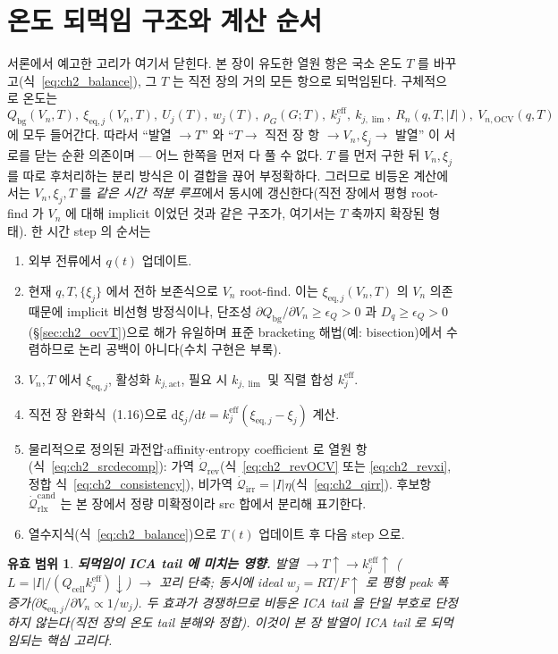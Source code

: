 \documentclass[11pt,a4paper]{article}
\newtheorem*{boundbox}{유효 범위}
\newcommand{\dd}{\mathrm{d}}
\newcommand{\eff}{\mathrm{eff}}
\newcommand{\eq}{\mathrm{eq}}
\newcommand{\cell}{\mathrm{cell}}
\newcommand{\bg}{\mathrm{bg}}
\newcommand{\OCV}{\mathrm{OCV}}
\newcommand{\rev}{\mathrm{rev}}
\newcommand{\irr}{\mathrm{irr}}
\newcommand{\rlx}{\mathrm{rlx}}
\newcommand{\cand}{\mathrm{cand}}
\begin{document}
\section{온도 되먹임 구조와 계산 순서}\label{sec:ch2_feedback}
서론에서 예고한 고리가 여기서 닫힌다. 본 장이 유도한 열원 항은 국소 온도 $T$ 를 바꾸고(식~\eqref{eq:ch2_balance}),
그 $T$ 는 직전 장의 거의 모든 항으로 되먹임된다. 구체적으로 온도는
\begin{equation}
Q_\bg(V_n,T),\ \xi_{\eq,j}(V_n,T),\ U_j(T),\ w_j(T),\ \rho_G(G;T),\ k_j^{\eff},\ k_{j,\lim},\ R_n(q,T,|I|),\ V_{n,\OCV}(q,T)
\label{eq:ch2_feedT}
\end{equation}
에 모두 들어간다. 따라서 ``발열 $\to T$'' 와 ``$T\to$ 직전 장 항 $\to V_n,\xi_j\to$ 발열'' 이 서로를 닫는 순환
의존이며 — 어느 한쪽을 먼저 다 풀 수 없다. $T$ 를 먼저 구한 뒤 $V_n,\xi_j$ 를 따로 후처리하는 분리 방식은 이 결합을
끊어 부정확하다. 그러므로 비등온 계산에서는 $V_n,\xi_j,T$ 를 \emph{같은 시간 적분 루프}에서 동시에 갱신한다(직전
장에서 평형 root-find 가 $V_n$ 에 대해 implicit 이었던 것과 같은 구조가, 여기서는 $T$ 축까지 확장된 형태). 한 시간
step 의 순서는
\begin{enumerate}[label=\arabic*),leftmargin=2.0em,itemsep=1pt]
\item 외부 전류에서 $q(t)$ 업데이트.
\item 현재 $q,T,\{\xi_j\}$ 에서 전하 보존식으로 $V_n$ root-find. 이는 $\xi_{\eq,j}(V_n,T)$ 의 $V_n$ 의존 때문에
  implicit 비선형 방정식이나, 단조성 $\partial Q_\bg/\partial V_n\ge\epsilon_Q>0$ 과 $D_q\ge\epsilon_Q>0$
  (\S\ref{sec:ch2_ocvT})으로 해가 유일하며 표준 bracketing 해법(예: bisection)에서 수렴하므로 논리 공백이
  아니다(수치 구현은 부록).
\item $V_n,T$ 에서 $\xi_{\eq,j}$, 활성화 $k_{j,\mathrm{act}}$, 필요 시 $k_{j,\lim}$ 및 직렬 합성 $k_j^{\eff}$.
\item 직전 장 완화식~(1.16)으로 $\dd\xi_j/\dd t=k_j^{\eff}(\xi_{\eq,j}-\xi_j)$ 계산.
\item 물리적으로 정의된 과전압$\cdot$affinity$\cdot$entropy coefficient 로 열원 항(식~\eqref{eq:ch2_srcdecomp}):
  가역 $\dot{\mathcal Q}_{\rev}$(식~\eqref{eq:ch2_revOCV} 또는 \eqref{eq:ch2_revxi}, 정합 식~\eqref{eq:ch2_consistency}),
  비가역 $\dot{\mathcal Q}_{\irr}=|I|\eta$(식~\eqref{eq:ch2_qirr}). 후보항 $\dot{\mathcal Q}_{\rlx}^{\cand}$ 는
  본 장에서 정량 미확정이라 src 합에서 분리해 표기한다.
\item 열수지식(식~\eqref{eq:ch2_balance})으로 $T(t)$ 업데이트 후 다음 step 으로.
\end{enumerate}
\begin{boundbox}
\textbf{되먹임이 ICA tail 에 미치는 영향.} 발열 $\to T\uparrow\to k_j^{\eff}\uparrow$ ($L=|I|/(Q_\cell k_j^{\eff})\downarrow$)
$\to$ 꼬리 단축; 동시에 ideal $w_j=RT/F\uparrow$ 로 평형 peak 폭 증가($\partial\xi_{\eq,j}/\partial V_n\propto1/w_j$).
두 효과가 경쟁하므로 비등온 ICA tail 을 단일 부호로 단정하지 않는다(직전 장의 온도 tail 분해와 정합). 이것이
본 장 발열이 ICA tail 로 되먹임되는 핵심 고리다.
\end{boundbox}
\end{document}
